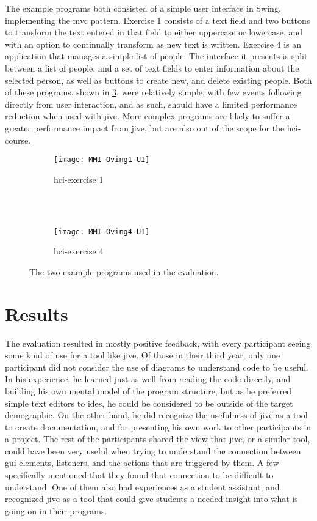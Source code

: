 The example programs both consisted of a simple user interface in Swing, implementing the \gls{mvc} pattern.
Exercise 1 consists of a text field and two buttons to transform the text entered in that field to either uppercase or lowercase, and with an option to continually transform as new text is written.
Exercise 4 is an application that manages a simple list of people.
The interface it presents is split between a list of people, and a set of text fields to enter information about the selected person, as well as buttons to create new, and delete existing people.
Both of these programs, shown in \cref{fig:MMI-Oving-UI}, were relatively simple, with few events following directly from user interaction, and as such, should have a limited performance reduction when used with \gls{jive}.
More complex programs are likely to suffer a greater performance impact from \gls{jive}, but are also out of the scope for the \gls{hci}-course.


\begin{figure}[H]
	\centering
	\begin{subfigure}{\textwidth}
		\centering
		\texttt{[image: MMI-Oving1-UI]}
		\caption{\gls{hci}-exercise 1}
		\label{fig:MMI-Oving1-UI}
	\end{subfigure}
	~\\
	~\\
	\begin{subfigure}{\textwidth}
		\centering
		\texttt{[image: MMI-Oving4-UI]}
		\caption{\gls{hci}-exercise 4}
		\label{fig:MMI-Oving4-UI}
	\end{subfigure}
	\caption{The two example programs used in the evaluation.}
	\label{fig:MMI-Oving-UI}
\end{figure}

\section{Results}\label{jiveEvalResults}

The evaluation resulted in mostly positive feedback, with every participant seeing some kind of use for a tool like \gls{jive}.
Of those in their third year, only one participant did not consider the use of diagrams to understand code to be useful.
In his experience, he learned just as well from reading the code directly, and building his own mental model of the program structure, but as he preferred simple text editors to \gls{ide}s, he could be considered to be outside of the target demographic.
On the other hand, he did recognize the usefulness of \gls{jive} as a tool to create documentation, and for presenting his own work to other participants in a project.
The rest of the participants shared the view that \gls{jive}, or a similar tool, could have been very useful when trying to understand the connection between \gls{gui} elements, listeners, and the actions that are triggered by them.
A few specifically mentioned that they found that connection to be difficult to understand.
One of them also had experiences as a student assistant, and recognized \gls{jive} as a tool that could give students a needed insight into what is going on in their programs.


